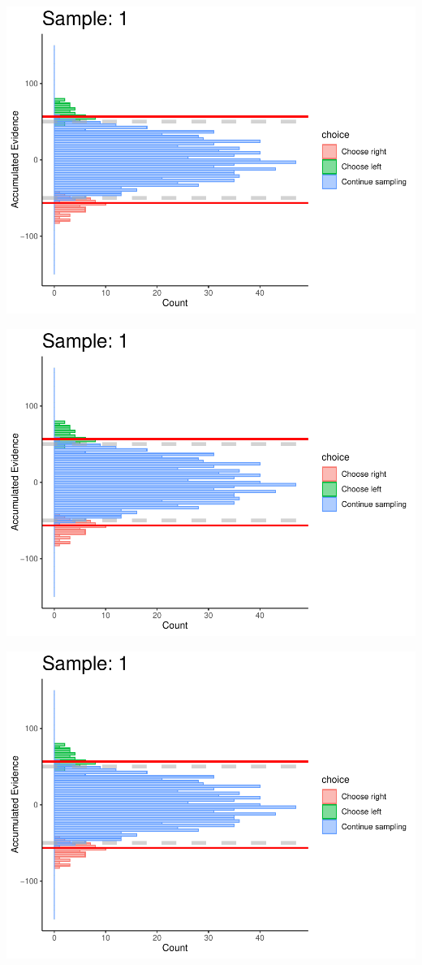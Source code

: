 \documentclass[
]{book}
\begin{document}
\begin{center}\includegraphics[width=0.8\linewidth]{LateNightBayes_files/figure-latex/fixed_dcb-4} \end{center}

\begin{center}\includegraphics[width=0.8\linewidth]{LateNightBayes_files/figure-latex/fixed_dcb-5} \end{center}

\begin{center}\includegraphics[width=0.8\linewidth]{LateNightBayes_files/figure-latex/fixed_dcb-6} \end{center}
\end{document}
